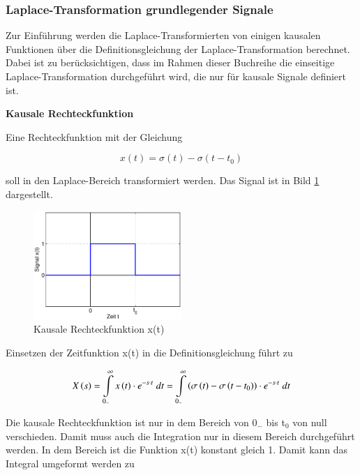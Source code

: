 \subsubsection{Laplace-Transformation grundlegender Signale}
\noindent Zur Einführung werden die Laplace-Transformierten von einigen kausalen Funktionen über die Definitionsgleichung der Laplace-Transformation berechnet. Dabei ist zu berücksichtigen, dass im Rahmen dieser Buchreihe die einseitige Laplace-Transformation durchgeführt wird, die nur für kausale Signale definiert ist.\medskip

{\selectfont
\noindent\textbf{Kausale Rechteckfunktion}}\smallskip

\noindent Eine Rechteckfunktion mit der Gleichung

\begin{equation}\label{eq:fourfour}
x\left(t\right)=\sigma \left(t\right)-\sigma \left(t-t_{0} \right)
\end{equation}

\noindent soll in den Laplace-Bereich transformiert werden. Das Signal ist in Bild \ref{fig:LaplaceSignaleRechteck} dargestellt.

\begin{figure}[H]
  \centerline{\includegraphics[width=0.5\textwidth]{Kapitel3/Bilder/image1}}
  \caption{Kausale Rechteckfunktion x(t)}
  \label{fig:LaplaceSignaleRechteck}
\end{figure}

\noindent Einsetzen der Zeitfunktion x(t) in die Definitionsgleichung führt zu

\begin{equation}\label{eq:fourfive}
X\left(s\right)=\int\limits _{0_{-} }^{\infty }x\left(t\right)\cdot e^{-s\cdot t} {\rm \; } dt=\int\limits _{0_{-} }^{\infty }\left(\sigma \left(t\right)-\sigma \left(t-t_{0} \right)\right)\cdot e^{-s\cdot t} {\rm \; } dt
\end{equation}

\noindent Die kausale Rechteckfunktion ist nur in dem Bereich von 0${}_{-}$ bis t${}_{0}$ von null verschieden. Damit muss auch die Integration nur in diesem Bereich durchgef\"{u}hrt werden. In dem Bereich ist die Funktion x(t) konstant gleich 1. Damit kann das Integral umgeformt werden zu

